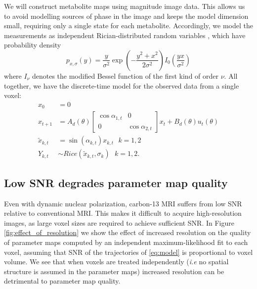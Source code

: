 \documentclass{article}
\begin{document}
We will construct metabolite maps using magnitude image data. This allows us to avoid modelling sources of phase in the image and keeps the model dimension small, requiring only a single state for each metabolite. Accordingly, we model the measurements as independent Rician-distributed random variables \cite{Gudbjartsson95}, which have probability density
\[
   p_{x, \sigma}(y) =  \frac{y}{\sigma^2} \exp\left( - \frac{y^2 + x^2}{2 \sigma^2} \right) I_0\left(\frac{y x}{\sigma^2} \right)
\]
where $I_\nu$ denotes the modified Bessel function of the first kind of order $\nu$.  All together, we have the discrete-time model for the observed data from a single voxel: 
\begin{equation}
\begin{split}
  x_0 &= 0 \\
  x_{t+1} &= A_d(\theta) \left[\begin{array}{cc} \cos \alpha_{1,t} & 0 \\  0 & \cos \alpha_{2, t} \end{array}\right]  x_t + B_d(\theta) u_t(\theta)  \\
 \tilde{x}_{k, t} &= \sin(\alpha_{k, t}) x_{k, t} \ \ \ k=1, 2 \\
  Y_{k, t} &\sim Rice(\tilde x_{k, t}, \sigma_k ) \ \ \ k = 1, 2. 
\end{split}
\label{eq:model}
\end{equation}


\subsection{Low SNR degrades parameter map quality} 

Even with dynamic nuclear polarization, carbon-13 MRI suffers from low SNR relative to conventional MRI. This makes it difficult to acquire high-resolution images, as large voxel sizes are required to achieve sufficient SNR. In Figure \ref{fig:effect_of_resolution} we show the effect of increased resolution on the quality of parameter maps computed by an independent maximum-likelihood fit to each voxel, assuming that SNR of the trajectories of \eqref{eq:model} is proportional to voxel volume.  We see that when voxels are treated independently (\emph{i.e} no spatial structure is assumed in the parameter maps) increased resolution can be detrimental to parameter map quality. 
\end{document}

